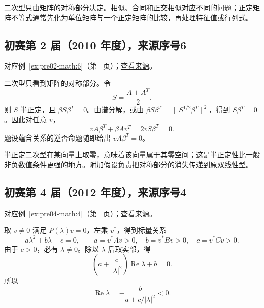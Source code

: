 \documentclass[UTF8,12pt,a4paper,fontset=fandol]{ctexart}
\begin{document}
二次型只由矩阵的对称部分决定。相似、合同和正交相似对应不同的问题；正定矩阵不等式通常先化为单位矩阵与一个正定矩阵的比较，再处理特征值或行列式。

\subsection{初赛第 2 届（2010 年度），来源序号6}\label{ans:pre02-math:6}\label{pr:pre02-math:6}

对应例~\ref{ex:pre02-math:6}（第~\pageref{ex:pre02-math:6} 页）；\href{https://github.com/lzxcr/cmc-mathematics/blob/64916fa1fdbc3e444a652eca204d5669058ee321/src/problems/preliminary/02/06.md}{查看来源}。

\begin{solve}

二次型只看到矩阵的对称部分。令
\[
S=\frac{A+A^T}{2}.
\]
则 $S$ 半正定，且 $\beta S\beta^T=0$。由谱分解，或由 $\beta S\beta^T=\|S^{1/2}\beta^T\|^2$，得到 $S\beta^T=0$。因此对任意 $v$，
\[
vA\beta^T+\beta Av^T=2vS\beta^T=0.
\]
题设蕴含关系的逆否命题随即给出 $vA\beta^T=0$。

\end{solve}

\begin{remark}[方法与条件]

半正定二次型在某向量上取零，意味着该向量属于其零空间；这是半正定性比一般非负数值条件更强的地方。附加假设负责把对称部分的消失传递到原双线性型。

\end{remark}

\subsection{初赛第 4 届（2012 年度），来源序号4}\label{ans:pre04-math:4}\label{pr:pre04-math:4}

对应例~\ref{ex:pre04-math:4}（第~\pageref{ex:pre04-math:4} 页）；\href{https://github.com/lzxcr/cmc-mathematics/blob/64916fa1fdbc3e444a652eca204d5669058ee321/src/problems/preliminary/04/04.md}{查看来源}。

\begin{solve}

取 $v\ne0$ 满足 $P(\lambda)v=0$，左乘 $v^*$，得到标量关系
\[
a\lambda^2+b\lambda+c=0,
\qquad a=v^*Av>0,\quad b=v^*Bv>0,\quad c=v^*Cv>0.
\]
由于 $c>0$，必有 $\lambda\ne0$。除以 $\lambda$ 后取实部，得
\[
\left(a+\frac{c}{|\lambda|^2}\right)\operatorname{Re}\lambda+b=0.
\]
所以
\[
\operatorname{Re}\lambda
=-\frac{b}{a+c/|\lambda|^2}<0.
\]

\end{solve}
\end{document}

